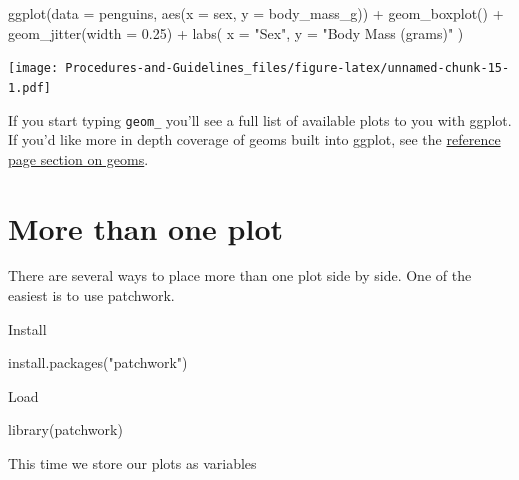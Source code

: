 \documentclass[
]{book}
\newenvironment{Shaded}{\begin{snugshade}}{\end{snugshade}}
\newcommand{\AttributeTok}[1]{\textcolor[rgb]{0.77,0.63,0.00}{#1}}
\newcommand{\FloatTok}[1]{\textcolor[rgb]{0.00,0.00,0.81}{#1}}
\newcommand{\FunctionTok}[1]{\textcolor[rgb]{0.00,0.00,0.00}{#1}}
\newcommand{\NormalTok}[1]{#1}
\newcommand{\SpecialCharTok}[1]{\textcolor[rgb]{0.00,0.00,0.00}{#1}}
\newcommand{\StringTok}[1]{\textcolor[rgb]{0.31,0.60,0.02}{#1}}
\begin{document}
\begin{Shaded}
\begin{Highlighting}[]
\FunctionTok{ggplot}\NormalTok{(}\AttributeTok{data =}\NormalTok{ penguins, }\FunctionTok{aes}\NormalTok{(}\AttributeTok{x =}\NormalTok{ sex, }\AttributeTok{y =}\NormalTok{ body\_mass\_g)) }\SpecialCharTok{+}
  \FunctionTok{geom\_boxplot}\NormalTok{() }\SpecialCharTok{+}
  \FunctionTok{geom\_jitter}\NormalTok{(}\AttributeTok{width =} \FloatTok{0.25}\NormalTok{) }\SpecialCharTok{+}
  \FunctionTok{labs}\NormalTok{(}
    \AttributeTok{x =} \StringTok{"Sex"}\NormalTok{,}
    \AttributeTok{y =} \StringTok{"Body Mass (grams)"}
\NormalTok{  )}
\end{Highlighting}
\end{Shaded}

\texttt{[image: Procedures-and-Guidelines\_files/figure-latex/unnamed-chunk-15-1.pdf]}

If you start typing \texttt{geom\_} you'll see a full list of available plots to you with ggplot. If you'd like more in depth coverage of geoms built into ggplot, see the \href{https://ggplot2.tidyverse.org/reference/index.html\#geoms}{reference page section on geoms}.

\hypertarget{more-than-one-plot}{%
\section{More than one plot}\label{more-than-one-plot}}

There are several ways to place more than one plot side by side. One of the easiest is to use patchwork.

Install

\begin{Shaded}
\begin{Highlighting}[]
\FunctionTok{install.packages}\NormalTok{(}\StringTok{"patchwork"}\NormalTok{)}
\end{Highlighting}
\end{Shaded}

Load

\begin{Shaded}
\begin{Highlighting}[]
\FunctionTok{library}\NormalTok{(patchwork)}
\end{Highlighting}
\end{Shaded}

This time we store our plots as variables
\end{document}
